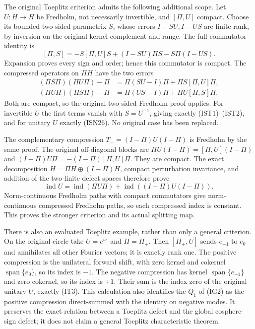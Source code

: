 \documentclass[
  11pt,
]{article}
\begin{document}
The original Toeplitz criterion admits the following additional scope.
Let \(U:H\to H\) be Fredholm, not necessarily invertible, and
\([\Pi,U]\) compact. Choose its bounded two-sided parametrix \(S\),
whose errors \(I-SU,I-US\) are finite rank, by inversion on the original
kernel complement and range. The full commutator identity is \[
 [\Pi,S]=-S[\Pi,U]S+(I-SU)\Pi S-S\Pi(I-US).
\tag{IT1}
\] Expansion proves every sign and order; hence this commutator is
compact. The compressed operators on \(\Pi H\) have the two errors \[
 \begin{split}
 (\Pi S\Pi)(\Pi U\Pi)-\Pi
     &=\Pi(SU-I)\Pi+\Pi S[\Pi,U]\Pi,\\
 (\Pi U\Pi)(\Pi S\Pi)-\Pi
     &=\Pi(US-I)\Pi+\Pi U[\Pi,S]\Pi.
 \end{split}
\tag{IT2}
\] Both are compact, so the original two-sided Fredholm proof applies.
For invertible \(U\) the first terms vanish with \(S=U^{-1}\), giving
exactly (IST1)--(IST2), and for unitary \(U\) exactly (ISN26). No
original case has been replaced.

The complementary compression \(T_-=(I-\Pi)U(I-\Pi)\) is Fredholm by the
same proof. The original off-diagonal blocks are
\(\Pi U(I-\Pi)=[\Pi,U](I-\Pi)\) and \((I-\Pi)U\Pi=-(I-\Pi)[\Pi,U]\Pi\).
They are compact. The exact decomposition \(H=\Pi H\oplus(I-\Pi)H\),
compact perturbation invariance, and addition of the two finite defect
spaces therefore prove \[
 \operatorname{ind}U=\operatorname{ind}(\Pi U\Pi)
                     +\operatorname{ind}((I-\Pi)U(I-\Pi)).
\tag{IT3}
\] Norm-continuous Fredholm paths with compact commutators give
norm-continuous compressed Fredholm paths, so each compressed index is
constant. This proves the stronger criterion and its actual splitting
map.

There is also an evaluated Toeplitz example, rather than only a general
criterion. On the original circle take \(U=e^{ix}\) and \(\Pi=\Pi_+\).
Then \([\Pi_+,U]\) sends \(e_{-1}\) to \(e_0\) and annihilates all other
Fourier vectors; it is exactly rank one. The positive compression is the
unilateral forward shift, with zero kernel and cokernel
\(\operatorname{span}\{e_0\}\), so its index is \(-1\). The negative
compression has kernel \(\operatorname{span}\{e_{-1}\}\) and zero
cokernel, so its index is \(+1\). Their sum is the index zero of the
original unitary \(U\), exactly (IT3). This calculation also identifies
the \(Q_1\) of (IG2) as the positive compression direct-summed with the
identity on negative modes. It preserves the exact relation between a
Toeplitz defect and the global cosphere-sign defect; it does not claim a
general Toeplitz characteristic theorem.
\end{document}
